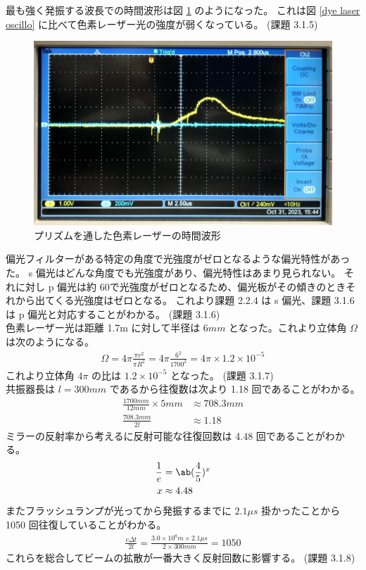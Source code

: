 \documentclass[uplatex,dvipdfmx,a4paper,11pt]{jlreq}
\numberwithin{equation}{section}
\theoremstyle{definition}
\begin{document}
最も強く発振する波長での時間波形は図 \ref{dye laser prism oscillo} のようになった。
これは図 \ref{dye laser oscillo} に比べて色素レーザー光の強度が弱くなっている。
(課題 3.1.5) \\
\begin{figure}[htbp]
  \centering
  \includegraphics[width=12cm]{./assets/dye_laser_prism.jpg}
  \caption{プリズムを通した色素レーザーの時間波形}
  \label{dye laser prism oscillo}
\end{figure}

偏光フィルターがある特定の角度で光強度がゼロとなるような偏光特性があった。
s 偏光はどんな角度でも光強度があり、偏光特性はあまり見られない。
それに対し p 偏光は約 60\textdegree で光強度がゼロとなるため、偏光板がその傾きのときそれから出てくる光強度はゼロとなる。
これより課題 2.2.4 は s 偏光、課題 3.1.6 は p 偏光と対応することがわかる。
(課題 3.1.6) \\

色素レーザー光は距離 1.7\si{m} に対して半径は $6\si{mm}$ となった。これより立体角 $\Omega$ は次のようになる。
\begin{align}
  \Omega = 4\pi\frac{\pi r^2}{\pi R^2} = 4\pi\frac{6^2}{1700^2} = 4\pi\times 1.2\times 10^{-5}
\end{align}
これより立体角 $4\pi$ の比は $1.2\times 10^{-5}$ となった。
(課題 3.1.7) \\

共振器長は $l = 300\si{mm}$ であるから往復数は次より 1.18 回であることがわかる。
\begin{align}
  \frac{1700 \si{mm}}{12 \si{mm}}\times 5\si{mm} & \approx 708.3\si{mm} \\
  \frac{708.3\si{mm}}{2l}                        & \approx 1.18
\end{align}
ミラーの反射率から考えるに反射可能な往復回数は 4.48 回であることがわかる。
\begin{align}
  \frac{1}{e} & = \ab(\frac{4}{5})^x \\
  x           & \approx 4.48
\end{align}
またフラッシュランプが光ってから発振するまでに $2.1\si{\mu s}$ 掛かったことから 1050 回往復していることがわかる。
\begin{align}
  \frac{c\Delta t}{2l} = \frac{3.0\times 10^8\si{m} \times 2.1\si{\mu s}}{2\times 300\si{mm}} = 1050
\end{align}
これらを総合してビームの拡散が一番大きく反射回数に影響する。
(課題 3.1.8) \\
\end{document}
